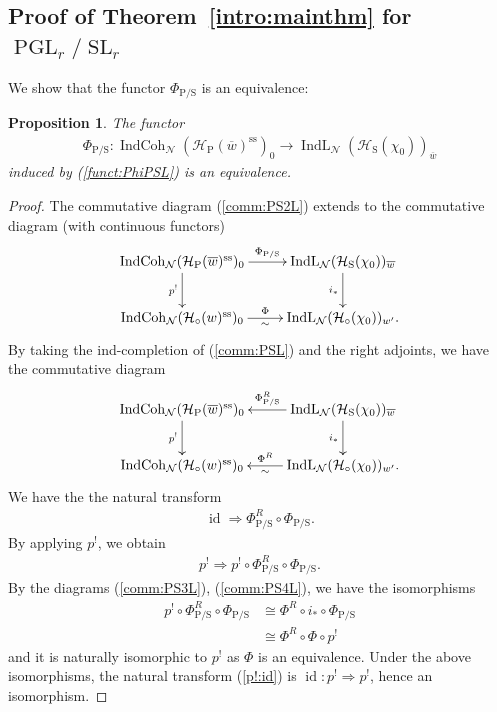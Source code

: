 \documentclass[11pt,oneside,a4paper,mathscr]{amsart}
\newtheorem{prop}[thm]{Proposition}
\theoremstyle{definition}
\newcommand{\cH}{\mathcal{H}}
\newcommand{\id}{\operatorname{id}}
\newcommand{\IndCoh}{\operatorname{IndCoh}}
\newcommand{\IndL}{\operatorname{IndL}}
\newcommand{\SL}{\operatorname{SL}}
\newcommand{\PGL}{\operatorname{PGL}}
\newcommand{\rS}{\mathrm{S}}
\newcommand{\rP}{\mathrm{P}}
\begin{document}
\subsection[Proof of Theorem 1.2 for PGLr/SLr]{Proof of Theorem~\ref{intro:mainthm} for \texorpdfstring{$\PGL_r/\SL_r$}{PGLr/SLr}}
We show that the functor $\Phi_{\rP/\rS}$ is an equivalence: 
\begin{prop}\label{prop:PGL}
The functor
\begin{align}\label{PhiPS}
    \Phi_{\rP/\rS} \colon \IndCoh_{\mathcal{N}}(\cH_{\mathrm{P}}(\overline{w})^{\mathrm{ss}})_0 \to \IndL_{\mathcal{N}}(\cH_{\rS}(\chi_0))_{\overline{w}}
\end{align}
induced by (\ref{funct:PhiPSL})
is an equivalence. 
\end{prop}
\begin{proof}
    The commutative diagram (\ref{comm:PS2L}) extends to 
    the commutative diagram (with continuous functors)
  \begin{align}\label{comm:PS3L}
\xymatrix{
\IndCoh_{\mathcal{N}}(\cH_{\mathrm{P}}(\overline{w})^{\mathrm{ss}})_0
\ar[r]^-{\Phi_{\rP/\rS}} \ar[d]_-{p^!}
&
\IndL_{\mathcal{N}}(\cH_{\rS}(\chi_0))_{\overline{w}} \ar[d]_-{i_{*}}
\\
\IndCoh_{\mathcal{N}}(\cH_{\circ}(w)^{\mathrm{ss}})_0
\ar[r]^-{\Phi}_-{\sim}
&
\IndL_{\mathcal{N}}(\cH_{\circ}(\chi_0))_{w'}.
}
\end{align}
By taking the ind-completion of (\ref{comm:PSL}) and the right adjoints, 
we have the commutative diagram 
\begin{align}\label{comm:PS4L}
\xymatrix{
\IndCoh_{\mathcal{N}}(\cH_{\mathrm{P}}(\overline{w})^{\mathrm{ss}})_0
\ar[d]_-{p^!}
&
\IndL_{\mathcal{N}}(\cH_{\rS}(\chi_0))_{\overline{w}} \ar[d]_-{i_{*}} 
\ar[l]_-{\Phi_{\rP/\rS}^R} 
\\
\IndCoh_{\mathcal{N}}(\cH_{\circ}(w)^{\mathrm{ss}})_0
&
\IndL_{\mathcal{N}}(\cH_{\circ}(\chi_0))_{w'}. \ar[l]_-{\Phi^R}^-{\sim}
}
\end{align}
We have the 
the natural transform 
\begin{align}\label{nat:P}
\id \Rightarrow \Phi_{\rP/\rS}^R\circ \Phi_{\rP/\rS}.
\end{align}
By applying $p^!$, we obtain 
\begin{align}\label{p!:id}
    p^! \Rightarrow p^!\circ \Phi_{\rP/\rS}^R\circ \Phi_{\rP/\rS}.
\end{align}
By the diagrams (\ref{comm:PS3L}), (\ref{comm:PS4L}), we have the isomorphisms
\begin{align*}
     p^!\circ \Phi_{\rP/\rS}^R \circ \Phi_{\rP/\rS}&\cong \Phi^R \circ i_{*} \circ \Phi_{\rP/\rS} \\
     &\cong \Phi^R \circ \Phi \circ p^! 
\end{align*}
and it is naturally isomorphic to $p^!$ as $\Phi$ is an equivalence. Under the above isomorphisms, 
the natural transform (\ref{p!:id}) is $\id \colon p^! \Rightarrow p^!$, hence an isomorphism. 


\end{proof}
\end{document}
